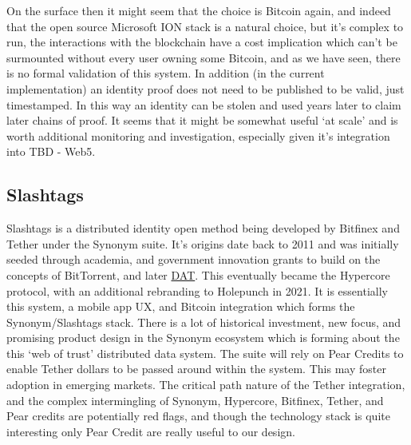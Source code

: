 On the surface then it might seem that the choice is Bitcoin again, and indeed that the open source Microsoft ION stack is a natural choice, but it's complex to run, the interactions with the blockchain have a cost implication which can't be surmounted without every user owning some Bitcoin, and as we have seen, there is no formal validation of this system. In addition (in the current implementation) an identity proof does not need to be published to be valid, just timestamped. In this way an identity can be stolen and used years later to claim later chains of proof. It seems that it might be somewhat useful `at scale' and is worth additional monitoring and investigation, especially given it's integration into TBD - Web5.
\subsection{Slashtags}
Slashtags is a distributed identity open method being developed by Bitfinex and Tether under the Synonym suite. It's origins date back to 2011 and was initially seeded through academia, and government innovation grants to build on the concepts of BitTorrent, and later \href{https://dat-ecosystem.org/timeline.html}{DAT}. This eventually became the Hypercore protocol, with an additional rebranding to Holepunch in 2021. It is essentially this system, a mobile app UX, and Bitcoin integration which forms the Synonym/Slashtags stack. There is a lot of historical investment, new focus, and promising product design in the Synonym ecosystem which is forming about the this `web of trust' distributed data system. The suite will rely on Pear Credits to enable Tether dollars to be passed around within the system. This may foster adoption in emerging markets. The critical path nature of the Tether integration, and the complex intermingling of Synonym, Hypercore, Bitfinex, Tether, and Pear credits are potentially red flags, and though the technology stack is quite interesting only Pear Credit are really useful to our design. 

